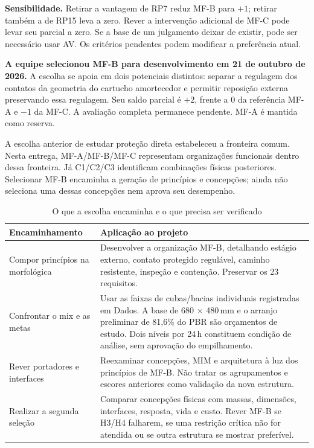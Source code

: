 \noindent\textbf{Sensibilidade.} Retirar a vantagem de RP7 reduz MF-B para $+1$; retirar também a de RP15 leva a zero. Rever a intervenção adicional de MF-C pode levar seu parcial a zero. Se a base de um julgamento deixar de existir, pode ser necessário usar AV. Os critérios pendentes podem modificar a preferência atual.


\noindent\textbf{A equipe selecionou MF-B para desenvolvimento em 21 de outubro de 2026.} A escolha se apoia em dois potenciais distintos: separar a regulagem dos contatos da geometria do cartucho amortecedor e permitir reposição externa preservando essa regulagem. Seu saldo parcial é $+2$, frente a $0$ da referência MF-A e $-1$ da MF-C. A avaliação completa permanece pendente. MF-A é mantida como reserva.

A escolha anterior de estudar proteção direta estabeleceu a fronteira comum. Nesta entrega, MF-A/MF-B/MF-C representam organizações funcionais dentro dessa fronteira. Já C1/C2/C3 identificam combinações físicas posteriores. Selecionar MF-B encaminha a geração de princípios e concepções; ainda não seleciona uma dessas concepções nem aprova seu desempenho.

\begin{table}[H]
\caption{O que a escolha encaminha e o que precisa ser verificado}
\centering\small
\begin{tabularx}{\textwidth}{L{4.0cm}Y}
\toprule\textbf{Encaminhamento}&\textbf{Aplicação ao projeto}\\\midrule
Compor princípios na morfológica&Desenvolver a organização MF-B, detalhando estágio externo, contato protegido regulável, caminho resistente, inspeção e contenção. Preservar os 23 requisitos.\\
Confrontar o mix e as metas&Usar as faixas de cubas/bacias individuais registradas em Dados. A base de 680 $\times$ 480\,mm e o arranjo preliminar de 81,6\% do PBR são orçamentos de estudo. Dois níveis por 24\,h constituem condição de análise, sem aprovação do empilhamento.\\
Rever portadores e interfaces&Reexaminar concepções, MIM e arquitetura à luz dos princípios de MF-B. Não tratar os agrupamentos e escores anteriores como validação da nova estrutura.\\
Realizar a segunda seleção&Comparar concepções físicas com massas, dimensões, interfaces, resposta, vida e custo. Rever MF-B se H3/H4 falharem, se uma restrição crítica não for atendida ou se outra estrutura se mostrar preferível.\\\bottomrule
\end{tabularx}
\end{table}

